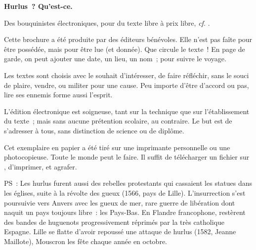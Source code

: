 \documentclass[french,twoside]{book} %
\newif\ifdev
\renewcommand{\LettrineFontHook}{\color{rubric}}
\newcommand{\initialiv}[2]{%
  \let\oldLFH\LettrineFontHook
  \IfSubStr{QJ’}{#1}{
    \lettrine[lines=4, lhang=0.2, loversize=-0.1, lraise=0.2]{\smash{#1}}{#2}
  }{\IfSubStr{É}{#1}{
    \lettrine[lines=4, lhang=0.2, loversize=-0, lraise=0]{\smash{#1}}{#2}
  }{\IfSubStr{ÀÂ}{#1}{
    \lettrine[lines=4, lhang=0.2, loversize=-0, lraise=0, slope=0.6em]{\smash{#1}}{#2}
  }{\IfSubStr{A}{#1}{
    \lettrine[lines=4, lhang=0.2, loversize=0.2, slope=0.6em]{\smash{#1}}{#2}
  }{\IfSubStr{V}{#1}{
    \lettrine[lines=4, lhang=0.2, loversize=0.2, slope=-0.5em]{\smash{#1}}{#2}
  }{
    \lettrine[lines=4, lhang=0.2, loversize=0.2]{\smash{#1}}{#2}
  }}}}}
  \let\LettrineFontHook\oldLFH
}
\renewcommand{\LettrineFontHook}{\bfseries\color{rubric}}
\begin{document}
  \hbox{}\newpage
  \ifodd\value{page}\hbox{}\newpage\fi
  {\centering\color{rubric}\bfseries\noindent\large
    Hurlus ? Qu’est-ce.\par
    \bigskip
  }
  \noindent Des bouquinistes électroniques, pour du texte libre à prix libre,
  \textit{cf.} \href{https://hurlus.fr}{}.\par
  \bigskip
  \noindent Cette brochure a été produite par des éditeurs bénévoles.
  Elle n’est pas faîte pour être possédée, mais pour être lue (et donnée).
  Que circule le texte !
  En page de garde, on peut ajouter une date, un lieu, un nom ;
  pour suivre le voyage.
  \par

  Les textes sont choisis avec le souhait d’intéresser, de faire réfléchir,
  sans le souci de plaire, vendre, ou militer pour une cause.
  Peu importe d’être d’accord ou pas, lire ses ennemis forme aussi l’esprit.
  \par

  L’édition électronique est soigneuse, tant sur la technique
  que sur l’établissement du texte ; mais sans aucune prétention scolaire, au contraire.
  Le but est de s’adresser à tous, sans distinction de science ou de diplôme.
  \par

  Cet exemplaire en papier a été tiré sur une imprimante personnelle
   ou une photocopieuse. Toute le monde peut le faire.
  Il suffit de
  télécharger un fichier sur \href{https://hurlus.fr}{},
  d’imprimer, et agrafer.\par

  \bigskip

  \noindent PS : Les hurlus furent aussi des rebelles protestants qui cassaient les statues dans les églises, suite à la révolte des gueux (1566, pays de Lille).
  L’insurrection s’est poursuivie vers Anvers avec les gueux de mer, rare guerre de libération dont naquit un pays toujours libre : les Pays-Bas.
  En Flandre francophone, restèrent des bandes de huguenots progressivement réprimés par la très catholique Espagne.
  Lille se flatte d’avoir repoussé une attaque de hurlus (1582, Jeanne Maillote), Mouscron les fête chaque année en octobre.
\fi

\ifdev %
\fontname\font — \textsc{Les règles du jeu}\par
(\hyperref[utopie]{\underline{Lien}})\par
\noindent \initialiv{A}{lors là}\blindtext\par
\noindent \initialiv{À}{ la bonheur des dames}\blindtext\par
\noindent \initialiv{É}{tonnez-le}\blindtext\par
\noindent \initialiv{Q}{ualitativement}\blindtext\par
\noindent \initialiv{V}{aloriser}\blindtext\par
\Blindtext
\phantomsection
\label{utopie}
\Blinddocument
\fi
\end{document}
